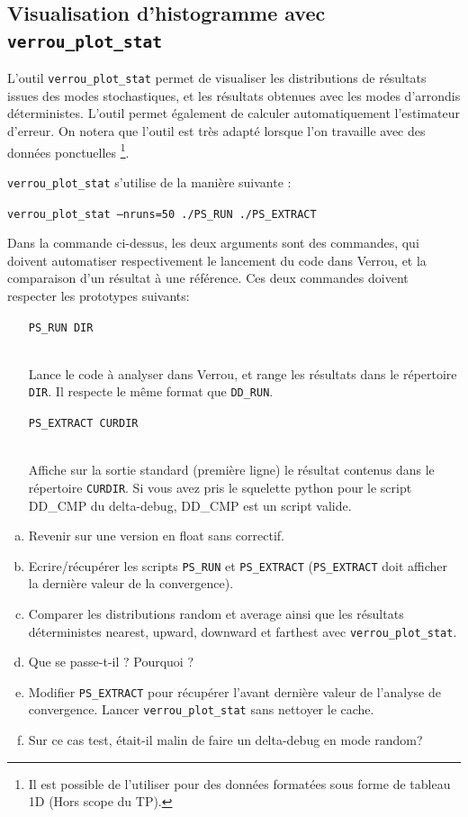 \documentclass[a4paper]{article}
\newcounter{Question}
\newenvironment{question}[1][\unskip]{
  \bigskip
  \stepcounter{Question}
  \def\questionTitle{ #1}
  \begin{mdframed}[style=question]
  }{
  \end{mdframed}
}
\begin{document}
\subsection{Visualisation d'histogramme avec \texttt{verrou\_plot\_stat}}
\label{ref:plotStat}

L'outil \texttt{verrou\_plot\_stat} permet de visualiser les
distributions de résultats issues des modes stochastiques, et les
résultats obtenues avec les modes d'arrondis déterministes. L'outil
permet également de calculer automatiquement l'estimateur d'erreur. On
notera que l'outil est très adapté lorsque l'on travaille avec des
données ponctuelles \footnote{Il est possible de l'utiliser pour des données
formatées sous forme de tableau 1D (Hors scope du TP).}. 


\texttt{verrou\_plot\_stat} s'utilise de la manière suivante :
\begin{center}
  \tt verrou\_plot\_stat --nruns=50 ./PS\_RUN ./PS\_EXTRACT
\end{center}

Dans la commande ci-dessus, les deux arguments sont des commandes, qui doivent
automatiser respectivement le lancement du code dans Verrou, et la comparaison
d'un résultat à une référence. Ces deux commandes doivent respecter les
prototypes suivants: \medskip
\begin{itemize}
\item[\tt PS\_RUN DIR]\strut\\
  Lance le code à analyser dans Verrou, et range les résultats dans le
  répertoire \texttt{DIR}. Il respecte le même format que \texttt{DD\_RUN}.
  \medskip
\item[\tt PS\_EXTRACT CURDIR]\strut\\
  Affiche sur la sortie standard (première ligne) le résultat contenus dans le répertoire
  \texttt{CURDIR}. Si vous avez pris le squelette python pour le script DD\_CMP du delta-debug, DD\_CMP
  est un script valide.
\end{itemize}

\begin{question}
\begin{enumerate}[(a)]
  \item Revenir sur une version en float sans correctif.
  \item Ecrire/récupérer les scripts \texttt{PS\_RUN} et
    \texttt{PS\_EXTRACT} (\texttt{PS\_EXTRACT} doit afficher la
    dernière valeur de la convergence). 
  \item Comparer les distributions random et average ainsi que les
    résultats déterministes nearest, upward, downward et farthest avec
    \texttt{verrou\_plot\_stat}. 
  \item Que se passe-t-il ? Pourquoi ?
  \item Modifier \texttt{PS\_EXTRACT} pour récupérer l'avant dernière
    valeur de l'analyse de convergence. Lancer
    \texttt{verrou\_plot\_stat} sans nettoyer le cache. 
  \item Sur ce cas test, était-il malin de faire un delta-debug en mode random?
\end{enumerate}
\end{question}
\end{document}
